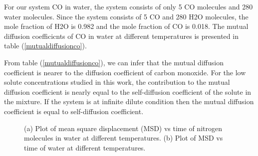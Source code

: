  For our system CO in water, the system consists of only 5 CO molecules  and 280 water molecules. Since the system  consists of 5 CO and 280 H2O molecules, the mole fraction of H2O is 0.982 and the mole fraction of CO  is 0.018.  The mutual diffusion coefficicnts of CO in water at different temperatures is presented in table (\ref{mutualdiffusionco}).
 
 \begin{table}[H]
 \centering
 \caption[The calculated value of mutual diffusion coefficient of Carbon monoxide in water.] {The calculated value of mutual diffusion coefficient of Carbon monoxide in water as a  function of temperature are listed.}
   \label{mutualdiffusionco}
 \end{table}
 
From table (\ref{mutualdiffusionco}), we can infer that the mutual diffusion coefficient is nearer to  the diffusion coefficient of carbon monoxide. For the low solute concentrations
 studied in this work, the contribution to the mutual diffusion coefficient is nearly
 equal to the self-diffusion coefficient of the solute in the mixture. If the system
 is at infinite dilute condition then the mutual diffusion coefficient is equal to
 self-diffusion coefficient.
 
  \begin{figure}[h!]
  \begin{center}
  \caption[Plot of mean square displacement (MSD) vs time of nitrogen  and water.] {(a) Plot of mean square displacement (MSD) vs time of nitrogen molecules  in water at  different temperatures. (b) Plot of MSD vs time of water at different temperatures.}
  \label{msdnitrogenwater}
  \end{center}
  \end{figure}
 

